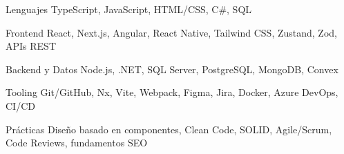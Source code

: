 

\begin{cvskills}

  \cvskill
    {Lenguajes} %
    {TypeScript, JavaScript, HTML/CSS, C\#, SQL} %

  \cvskill
    {Frontend} %
    {React, Next.js, Angular, React Native, Tailwind CSS, Zustand, Zod, APIs REST} %

  \cvskill
    {Backend y Datos} %
    {Node.js, .NET, SQL Server, PostgreSQL, MongoDB, Convex} %

  \cvskill
    {Tooling} %
    {Git/GitHub, Nx, Vite, Webpack, Figma, Jira, Docker, Azure DevOps, CI/CD} %

  \cvskill
    {Prácticas} %
    {Diseño basado en componentes, Clean Code, SOLID, Agile/Scrum, Code Reviews, fundamentos SEO} %

\end{cvskills}
